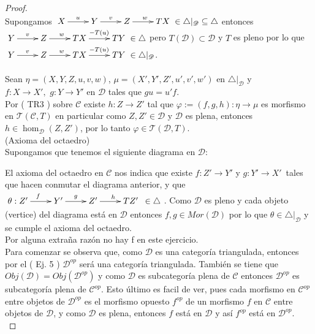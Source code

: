 \documentclass{article}
\begin{document}
\begin{enumerate}
\begin{proof}
\\
Supongamos $\xymatrix{X\ar[r]^{u}&Y\ar[r]^{v}&Z\ar[r]^{w}&TX}\in \triangle|_{\mathscr{D}}\subseteq \triangle$ entonces \\
$\xymatrix{Y\ar[r]^{v}&Z\ar[r]^{w}&TX\ar[r]^{-T(u)}&TY}\in \triangle$ pero $T(\mathscr{D})\subset \mathscr{D}$ y $T$ es pleno por lo que 
$\xymatrix{Y\ar[r]^{v}&Z\ar[r]^{w}&TX\ar[r]^{-T(u)}&TY}\in \triangle|_{\mathscr{D}}$.\\

\\
Sean $\eta=(X,Y,Z,u,v,w)$, $\mu=(X',Y',Z',u',v',w')$ en $\triangle|_{\mathscr{D}}$ y\\$f:X\to X',\,\, g:Y\to Y'$ en $\mathscr{D}$ tales que $gu=u'f$.\\
Por ( TR3 ) sobre $\mathscr{C}$ existe $h:Z\to Z'$ tal que $\varphi:=(f,g,h):\eta\to \mu$ es morfismo en $\mathscr{T}(\mathscr{C},T)$ en particular
como $Z,Z'\in \mathscr{D}$ y $\mathscr{D}$ es plena, entonces $h\in \hom_{\mathscr{D}}(Z,Z')$, por lo tanto $\varphi\in \mathscr{T}(\mathscr{D},T)$.
\\

 (Axioma del octaedro)\\
Supongamos que tenemos el siguiente diagrama en $\mathscr{D}$:\\
\centerline{
} 
El axioma del octaedro en $\mathscr{C}$ nos indica que existe $f:Z'\to Y'$ y $g:Y'\to X'$ \,tales que hacen conmutar el diagrama anterior, y que\\
$\xymatrix{\theta:Z'\ar[r]^f&Y'\ar[r]^g&Z'\ar[r]^{h\quad}&TZ' \,\,\, \in \triangle}$. Como $\mathscr{D}$ es pleno y cada objeto (vertice) 
del diagrama está en 
$\mathscr{D}$ entonces $f,g\in Mor(\mathscr{D})$ por lo que $\theta\in  \triangle|_{\mathscr{D}}$ y se cumple el axioma del octaedro.\\

 Por alguna extraña razón no hay f en este ejercicio.\\

 Para comenzar se observa que, como $\mathscr{D}$ es una categoría triangulada, entonces por el ( Ej. 5 )  $\mathscr{D}^{op}$ 
será una categoría triangulada. También se tiene que $Obj(\mathscr{D})=Obj(\mathscr{D}^{op})$ y como $\mathscr{D}$ es subcategoría plena de 
$\mathscr{C}$ entonces $\mathscr{D}^{op}$ es subcategoría plena de $\mathscr{C}^{op}$. Esto último es facil de ver, pues cada morfismo en 
$\mathscr{C}^{op}$ entre objetos de $\mathscr{D}^{op}$ es el morfismo opuesto $f^{op}$ de un morfismo $f$ en $\mathscr{C}$ entre objetos de
$\mathscr{D}$, y como $\mathscr{D}$ es plena, entonces $f$ está en $\mathscr{D}$ y así $f^{op}$ está en $\mathscr{D}^{op}$.\\


\end{proof}
\end{enumerate}
\end{document}
